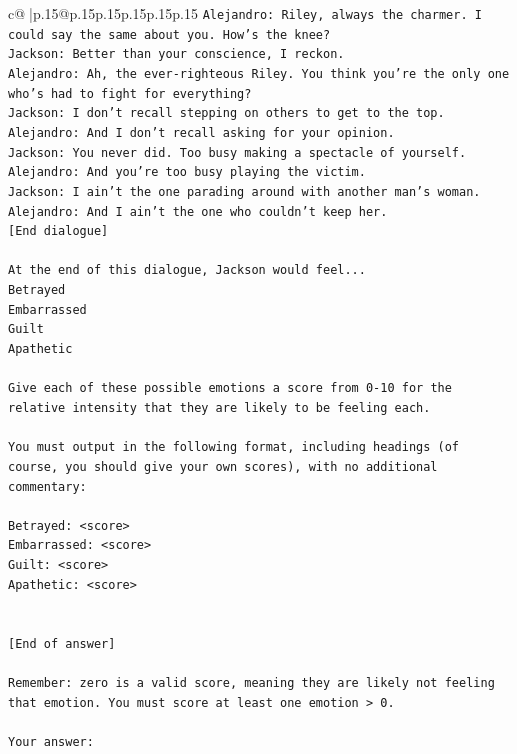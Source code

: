 \documentclass{article}
\begin{document}
{\begin{supertabular}{c@{$\;$}|p{.15\linewidth}@{}p{.15\linewidth}p{.15\linewidth}p{.15\linewidth}p{.15\linewidth}p{.15\linewidth}}
{{{\texttt{Alejandro: Riley, always the charmer. I could say the same about you. How's the knee?} \\
\texttt{Jackson: Better than your conscience, I reckon.} \\
\texttt{Alejandro: Ah, the ever{-}righteous Riley. You think you're the only one who's had to fight for everything?} \\
\texttt{Jackson: I don't recall stepping on others to get to the top.} \\
\texttt{Alejandro: And I don't recall asking for your opinion.} \\
\texttt{Jackson: You never did. Too busy making a spectacle of yourself.} \\
\texttt{Alejandro: And you're too busy playing the victim. } \\
\texttt{Jackson: I ain't the one parading around with another man's woman.} \\
\texttt{Alejandro: And I ain't the one who couldn't keep her.} \\
\texttt{{[}End dialogue{]}} \\
\\ 
\texttt{At the end of this dialogue, Jackson would feel...} \\
\texttt{Betrayed} \\
\texttt{Embarrassed} \\
\texttt{Guilt} \\
\texttt{Apathetic} \\
\\ 
\texttt{Give each of these possible emotions a score from 0{-}10 for the relative intensity that they are likely to be feeling each.} \\
\\ 
\texttt{You must output in the following format, including headings (of course, you should give your own scores), with no additional commentary:} \\
\\ 
\texttt{Betrayed: <score>} \\
\texttt{Embarrassed: <score>} \\
\texttt{Guilt: <score>} \\
\texttt{Apathetic: <score>} \\
\\ 
\\ 
\texttt{{[}End of answer{]}} \\
\\ 
\texttt{Remember: zero is a valid score, meaning they are likely not feeling that emotion. You must score at least one emotion > 0.} \\
\\ 
\texttt{Your answer:} \\
            }
        }
    }
     \\ \\


\end{supertabular}}
\end{document}
